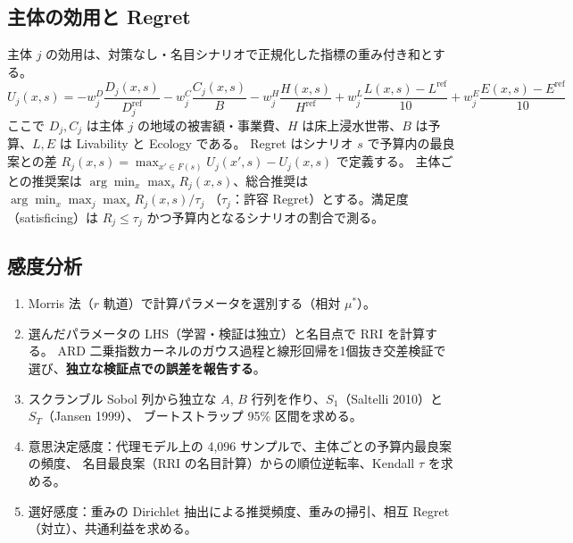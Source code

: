 \documentclass[a4paper,10pt]{ltjsarticle}
\begin{document}
\subsection{主体の効用と Regret}
主体 $j$ の効用は、対策なし・名目シナリオで正規化した指標の重み付き和とする。
\begin{equation}
U_j(x,s) = -w^{D}_j\frac{D_j(x,s)}{D^{\mathrm{ref}}_j} - w^{C}_j\frac{C_j(x,s)}{B}
 - w^{H}_j\frac{H(x,s)}{H^{\mathrm{ref}}}
 + w^{L}_j\frac{L(x,s)-L^{\mathrm{ref}}}{10} + w^{E}_j\frac{E(x,s)-E^{\mathrm{ref}}}{10}
\end{equation}
ここで $D_j, C_j$ は主体 $j$ の地域の被害額・事業費、$H$ は床上浸水世帯、$B$ は予算、$L, E$ は Livability と Ecology である。
Regret はシナリオ $s$ で予算内の最良案との差 $R_j(x,s)=\max_{x'\in F(s)}U_j(x',s)-U_j(x,s)$ で定義する。
主体ごとの推奨案は $\arg\min_x \max_s R_j(x,s)$、総合推奨は $\arg\min_x \max_j \max_s R_j(x,s)/\tau_j$
（$\tau_j$：許容 Regret）とする。満足度（satisficing）は $R_j\le\tau_j$ かつ予算内となるシナリオの割合で測る。

\subsection{感度分析}
\begin{enumerate}
\item Morris 法（$r$ 軌道）で計算パラメータを選別する（相対 $\mu^*$）。
\item 選んだパラメータの LHS（学習・検証は独立）と名目点で RRI を計算する。
ARD 二乗指数カーネルのガウス過程と線形回帰を1個抜き交差検証で選び、\textbf{独立な検証点での誤差を報告する}。
\item スクランブル Sobol 列から独立な $A$, $B$ 行列を作り、$S_1$（Saltelli 2010）と $S_T$（Jansen 1999）、
ブートストラップ 95\% 区間を求める。
\item 意思決定感度：代理モデル上の 4,096 サンプルで、主体ごとの予算内最良案の頻度、
名目最良案（RRI の名目計算）からの順位逆転率、Kendall $\tau$ を求める。
\item 選好感度：重みの Dirichlet 抽出による推奨頻度、重みの掃引、相互 Regret（対立）、共通利益を求める。
\end{enumerate}
\end{document}
